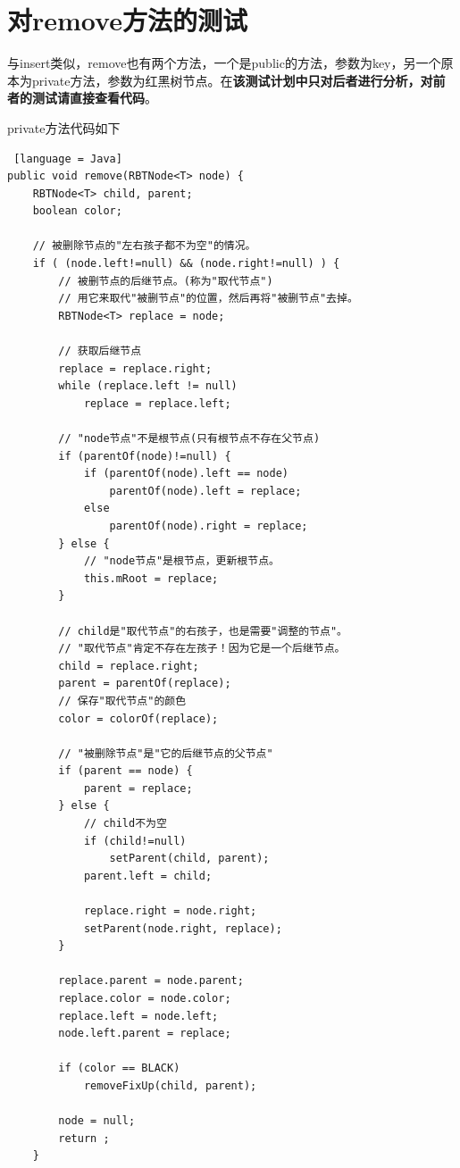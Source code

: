 \documentclass[12pt, a4paper, oneside]{ctexart}
\begin{document}
\section{对remove方法的测试}

与insert类似，remove也有两个方法，一个是public的方法，参数为key，另一个原本为private方法，参数为红黑树节点。在\textbf{该测试计划中只对后者进行分析，对前者的测试请直接查看代码}。

private方法代码如下

\begin{lstlisting} [language = Java]
public void remove(RBTNode<T> node) {
    RBTNode<T> child, parent;
    boolean color;

    // 被删除节点的"左右孩子都不为空"的情况。
    if ( (node.left!=null) && (node.right!=null) ) {
        // 被删节点的后继节点。(称为"取代节点")
        // 用它来取代"被删节点"的位置，然后再将"被删节点"去掉。
        RBTNode<T> replace = node;

        // 获取后继节点
        replace = replace.right;
        while (replace.left != null)
            replace = replace.left;

        // "node节点"不是根节点(只有根节点不存在父节点)
        if (parentOf(node)!=null) {
            if (parentOf(node).left == node)
                parentOf(node).left = replace;
            else
                parentOf(node).right = replace;
        } else {
            // "node节点"是根节点，更新根节点。
            this.mRoot = replace;
        }

        // child是"取代节点"的右孩子，也是需要"调整的节点"。
        // "取代节点"肯定不存在左孩子！因为它是一个后继节点。
        child = replace.right;
        parent = parentOf(replace);
        // 保存"取代节点"的颜色
        color = colorOf(replace);

        // "被删除节点"是"它的后继节点的父节点"
        if (parent == node) {
            parent = replace;
        } else {
            // child不为空
            if (child!=null)
                setParent(child, parent);
            parent.left = child;

            replace.right = node.right;
            setParent(node.right, replace);
        }

        replace.parent = node.parent;
        replace.color = node.color;
        replace.left = node.left;
        node.left.parent = replace;

        if (color == BLACK)
            removeFixUp(child, parent);

        node = null;
        return ;
    }


\end{lstlisting}
\end{document}
